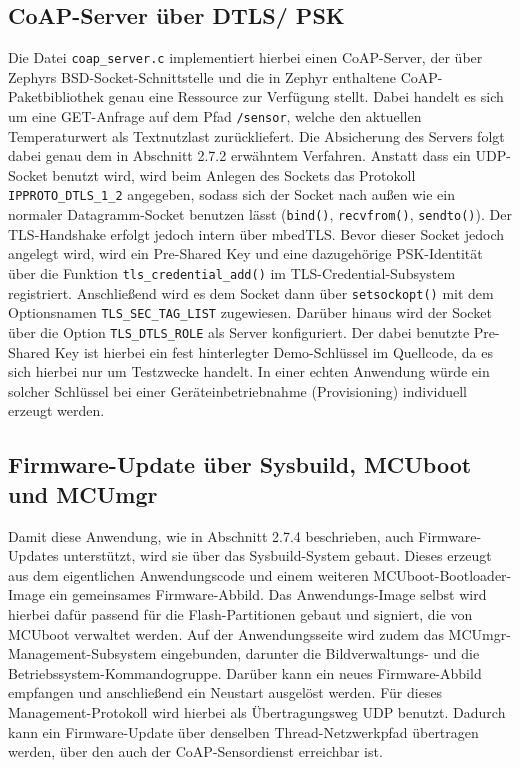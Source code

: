 \subsection{CoAP-Server {\"u}ber DTLS/ PSK}
Die Datei \lstinline[style=fileinline]|coap_server.c| implementiert hierbei einen CoAP-Server, der {\"u}ber Zephyrs BSD-Socket-Schnittstelle und die in Zephyr enthaltene CoAP-Paketbibliothek genau eine Ressource zur Verf{\"u}gung stellt. Dabei handelt es sich um eine GET-Anfrage auf dem Pfad \lstinline[style=fileinline]|/sensor|, welche den aktuellen Temperaturwert als Textnutzlast zur{\"u}ckliefert. Die Absicherung des Servers folgt dabei genau dem in Abschnitt 2.7.2 erw{\"a}hntem Verfahren. Anstatt dass ein UDP-Socket benutzt wird, wird beim Anlegen des Sockets das Protokoll \lstinline[style=fileinline]|IPPROTO_DTLS_1_2| angegeben, sodass sich der Socket nach au{\ss}en wie ein normaler Datagramm-Socket benutzen l{\"a}sst (\lstinline[style=fileinline]|bind()|, \lstinline[style=fileinline]|recvfrom()|, \lstinline[style=fileinline]|sendto()|). Der TLS-Handshake erfolgt jedoch intern {\"u}ber mbedTLS. Bevor dieser Socket jedoch angelegt wird, wird ein Pre-Shared Key und eine dazugeh{\"o}rige PSK-Identit{\"a}t {\"u}ber die Funktion \lstinline[style=fileinline]|tls_credential_add()| im TLS-Credential-Subsystem registriert. Anschlie{\ss}end wird es dem Socket dann {\"u}ber \lstinline[style=fileinline]|setsockopt()| mit dem Optionsnamen \lstinline[style=fileinline]|TLS_SEC_TAG_LIST| zugewiesen. Dar{\"u}ber hinaus wird der Socket {\"u}ber die Option \lstinline[style=fileinline]|TLS_DTLS_ROLE| als Server konfiguriert. Der dabei benutzte Pre-Shared Key ist hierbei ein fest hinterlegter Demo-Schl{\"u}ssel im Quellcode, da es sich hierbei nur um Testzwecke handelt. In einer echten Anwendung w{\"u}rde ein solcher Schl{\"u}ssel bei einer Ger{\"a}teinbetriebnahme (Provisioning) individuell erzeugt werden.

\subsection{Firmware-Update {\"u}ber Sysbuild, MCUboot und MCUmgr}
Damit diese Anwendung, wie in Abschnitt 2.7.4 beschrieben, auch Firmware-Updates unterst{\"u}tzt, wird sie {\"u}ber das Sysbuild-System gebaut. Dieses erzeugt aus dem eigentlichen Anwendungscode und einem weiteren MCUboot-Bootloader-Image ein gemeinsames Firmware-Abbild. Das Anwendungs-Image selbst wird hierbei daf{\"u}r passend f{\"u}r die Flash-Partitionen gebaut und signiert, die von MCUboot verwaltet werden. Auf der Anwendungsseite wird zudem das MCUmgr-Management-Subsystem eingebunden, darunter die Bildverwaltungs- und die Betriebssystem-Kommandogruppe. Dar{\"u}ber kann ein neues Firmware-Abbild empfangen und anschlie{\ss}end ein Neustart ausgel{\"o}st werden. F{\"u}r dieses Management-Protokoll wird hierbei als {\"U}bertragungsweg UDP benutzt. Dadurch kann ein Firmware-Update {\"u}ber denselben Thread-Netzwerkpfad {\"u}bertragen werden, {\"u}ber den auch der CoAP-Sensordienst erreichbar ist.
